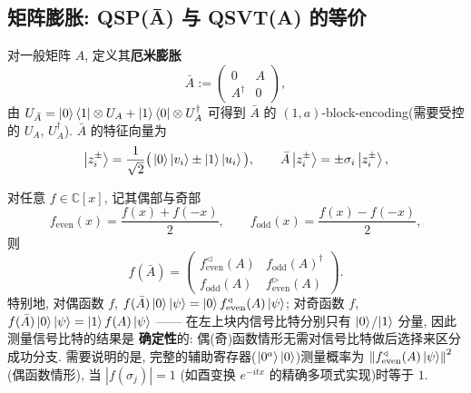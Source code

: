 \documentclass[utf8]{article} %
\numberwithin{equation}{section}   %
\newtheorem{Def}{\hskip 2em {\color{green} 定义}}[subsection]
\newtheorem{Prop}{\hskip 2em {\color{cyan} 命题}}[subsection]
\begin{document}
\subsection{矩阵膨胀: QSP(Ā) 与 QSVT(A) 的等价}

\begin{Def}[厄米膨胀]
    对一般矩阵 $A$, 定义其\textbf{厄米膨胀}
    \begin{equation}
        \bar{A} := \begin{pmatrix} 0 & A \\ A^\dagger & 0 \end{pmatrix},
    \end{equation}
    由 $U_{\bar{A}} = \ket{0}\bra{1}\otimes U_A + \ket{1}\bra{0}\otimes U_A^\dagger$
    可得到 $\bar{A}$ 的 $(1,a)$-block-encoding(需要受控的 $U_A$, $U_A^\dagger$).
    $\bar{A}$ 的特征向量为
    \begin{equation}
        \ket{z_i^\pm} = \frac{1}{\sqrt{2}}\big(\ket{0}\ket{v_i} \pm \ket{1}\ket{u_i}\big),
        \qquad
        \bar{A}\ket{z_i^\pm} = \pm \sigma_i \ket{z_i^\pm},
    \end{equation}
\end{Def}

\begin{Prop}
    对任意 $f \in \mathbb{C}[x]$, 记其偶部与奇部
    \begin{equation}
        f_{\mathrm{even}}(x) = \frac{f(x) + f(-x)}{2}, \qquad
        f_{\mathrm{odd}}(x) = \frac{f(x) - f(-x)}{2},
    \end{equation}
    则
    \begin{equation}
        f(\bar{A}) = \begin{pmatrix}
            f_{\mathrm{even}}^\triangleleft(A) & f_{\mathrm{odd}}(A)^\dagger \\
            f_{\mathrm{odd}}(A) & f_{\mathrm{even}}^\triangleright(A)
        \end{pmatrix}.
    \end{equation}
    特别地, 对偶函数 $f$, $f(\bar{A})\ket{0}\ket{\psi} = \ket{0}f_{\mathrm{even}}^\triangleleft(A)\ket{\psi}$;
    对奇函数 $f$, $f(\bar{A})\ket{0}\ket{\psi} = \ket{1}f(A)\ket{\psi}$ ——
    在左上块内信号比特分别只有 $\ket{0}$/$\ket{1}$ 分量, 因此测量信号比特的结果是
    \textbf{确定性}的: 偶(奇)函数情形无需对信号比特做后选择来区分成功分支. 需要说明的是,
    完整的辅助寄存器($\ket{0^a}\ket{0}$)测量概率为
    $\norm{f_{\mathrm{even}}^\triangleleft(A)\ket{\psi}}^2$(偶函数情形), 当 $|f(\sigma_j)|=1$
    (如酉变换 $e^{-itx}$ 的精确多项式实现)时等于 $1$.
\end{Prop}
\end{document}

